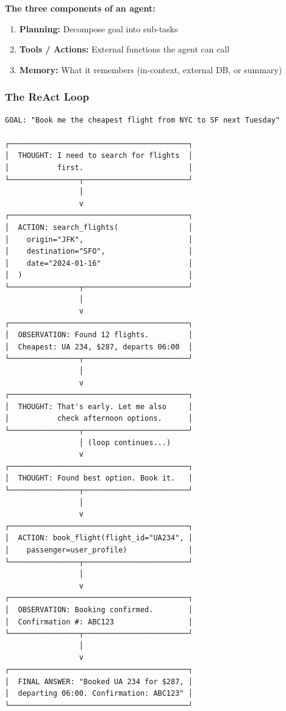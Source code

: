 \documentclass[11pt]{article}
\providecommand{\tightlist}{\setlength{\itemsep}{1pt}\setlength{\parskip}{0pt}}
\begin{document}
\textbf{The three components of an agent:}

\begin{enumerate}
\def\labelenumi{\arabic{enumi}.}
\tightlist
\item
  \textbf{Planning:} Decompose goal into sub-tasks
\item
  \textbf{Tools / Actions:} External functions the agent can call
\item
  \textbf{Memory:} What it remembers (in-context, external DB, or summary)
\end{enumerate}

\subsubsection{The ReAct Loop}\label{the-react-loop}

\setcodelang{}

\begin{verbatim}
GOAL: "Book me the cheapest flight from NYC to SF next Tuesday"

┌─────────────────────────────────────────┐
│  THOUGHT: I need to search for flights  │
│           first.                        │
└────────────────┬────────────────────────┘
                 │
                 v
┌─────────────────────────────────────────┐
│  ACTION: search_flights(                │
│    origin="JFK",                        │
│    destination="SFO",                   │
│    date="2024-01-16"                    │
│  )                                      │
└────────────────┬────────────────────────┘
                 │
                 v
┌─────────────────────────────────────────┐
│  OBSERVATION: Found 12 flights.         │
│  Cheapest: UA 234, $287, departs 06:00  │
└────────────────┬────────────────────────┘
                 │
                 v
┌─────────────────────────────────────────┐
│  THOUGHT: That's early. Let me also     │
│           check afternoon options.      │
└────────────────┬────────────────────────┘
                 │ (loop continues...)
                 v
┌─────────────────────────────────────────┐
│  THOUGHT: Found best option. Book it.   │
└────────────────┬────────────────────────┘
                 │
                 v
┌─────────────────────────────────────────┐
│  ACTION: book_flight(flight_id="UA234", │
│    passenger=user_profile)              │
└────────────────┬────────────────────────┘
                 │
                 v
┌─────────────────────────────────────────┐
│  OBSERVATION: Booking confirmed.        │
│  Confirmation #: ABC123                 │
└────────────────┬────────────────────────┘
                 │
                 v
┌─────────────────────────────────────────┐
│  FINAL ANSWER: "Booked UA 234 for $287, │
│  departing 06:00. Confirmation: ABC123" │
└─────────────────────────────────────────┘
\end{verbatim}
\end{document}
